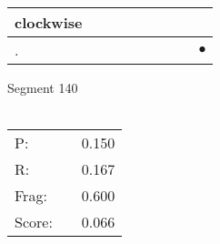 \documentclass[landscape]{article}
\newcommand{\ssp}{\hspace{2pt}}
\newcommand{\mex}{\cellcolor{g}$\bullet$}
\begin{document}
\begin{tabular}{|l|p{10pt}|p{10pt}|p{10pt}|p{10pt}|p{10pt}|p{10pt}|p{10pt}|p{10pt}|}
\hline
\ssp clockwise \ssp&\hspace{2pt}&\hspace{2pt}&\hspace{2pt}&\hspace{2pt}&\hspace{2pt}&\hspace{2pt}&\hspace{2pt}&\hspace{2pt}\\
\hline
\ssp \cellcolor{ref7}. \ssp&\hspace{2pt}&\hspace{2pt}&\hspace{2pt}&\hspace{2pt}&\hspace{2pt}&\hspace{2pt}&\hspace{2pt}&\hspace{2pt}\mex\\
\hline
\end{tabular}

\vspace{6pt}
\noindent Segment 140\\\\
\noindent\begin{tabular}{lm{12pt}r}
\hline
P:&&0.150\\
R:&&0.167\\
Frag:&&0.600\\
Score:&&0.066\\
\end{tabular}

\newpage
\end{document}
